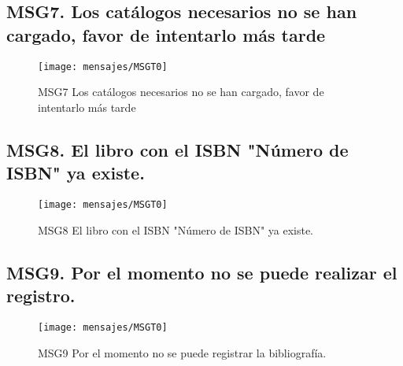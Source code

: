 \subsection{MSG7. Los catálogos necesarios no se han cargado, favor de intentarlo más tarde}
    \begin{figure}[htbp]
        \begin{center}
            \texttt{[image: mensajes/MSGT0]}
            \caption{MSG7 Los catálogos necesarios no se han cargado, favor de intentarlo más tarde}
            \label{fig:MSG7}
        \end{center}
    \end{figure}
    
\subsection{MSG8. El libro con el ISBN "Número de ISBN" ya existe.}
    \begin{figure}[htbp]
        \begin{center}
            \texttt{[image: mensajes/MSGT0]}
            \caption{MSG8 El libro con el ISBN "Número de ISBN" ya existe.}
            \label{fig:MSG8}
        \end{center}
    \end{figure}

\subsection{MSG9. Por el momento no se puede realizar el registro.}
    \begin{figure}[htbp]
        \begin{center}
            \texttt{[image: mensajes/MSGT0]}
            \caption{MSG9 Por el momento no se puede registrar la bibliografía.}
            \label{fig:MSG9}
        \end{center}
    \end{figure}

